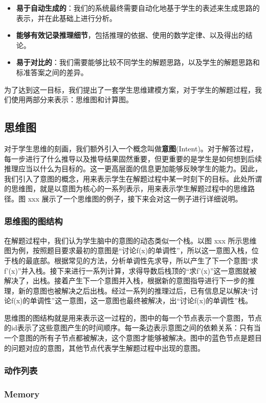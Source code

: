 \begin{itemize}
    \item \textbf{易于自动生成的}：我们的系统最终需要自动化地基于学生的表述来生成思路的表示，并在此基础上进行分析。
    \item \textbf{能够有效记录推理细节}，包括推理的依据、使用的数学定律、以及得出的结论。
    \item \textbf{易于对比的}：我们需要能够比较不同学生的解题思路，以及学生的解题思路和标准答案之间的差异。
\end{itemize}

为了达到这一目标，我们提出了一套学生思维建模方案，对于学生的解题过程，我们使用两部分来表示：思维图和计算图。

\subsection{思维图}

对于学生思维的刻画，我们额外引入一个概念叫做\textbf{意图}(Intent)。对于解答过程，每一步进行了什么推导以及推导结果固然重要，但更重要的是学生是如何想到后续推理应当以什么为目标的。这一更高层面的信息更加能够反映学生的能力。因此，我们引入了意图的概念，用来表示学生在解题过程中某一时刻下的目标。此处所谓的思维图，就是以意图为核心的一系列表示，用来表示学生解题过程中的思维路径。图 xxx 展示了一个思维图的例子，接下来会对这一例子进行详细说明。


\subsubsection*{思维图的图结构}

在解题过程中，我们认为学生脑中的意图的动态类似一个栈。以图 xxx 所示思维图为例，按照题目要求最初的意图是“讨论f(x)的单调性”，所以这一意图入栈，位于栈的最底部。根据常见的方法，分析单调性先求导，所以产生了下一个意图“求f'(x)”并入栈。接下来进行一系列计算，求得导数后栈顶的“求f'(x)”这一意图就被解决了，出栈。接着产生下一个意图并入栈，根据新的意图指导进行下一步的推理，新的意图也被解决之后出栈。经过一系列的推理过后，已有信息足以解决“讨论f(x)的单调性”这一意图，这一意图也最终被解决，出“讨论f(x)的单调性”栈。

思维图的图结构就是用来表示这一过程的，图中的每一个节点表示一个意图，节点的id表示了这些意图产生的时间顺序。每一条边表示意图之间的依赖关系：只有当一个意图的所有子节点都被解决，这个意图才能够被解决。图中的蓝色节点是题目的问题对应的意图，其他节点代表学生解题过程中出现的意图。

\subsubsection*{动作列表}

\subsubsection*{Memory}